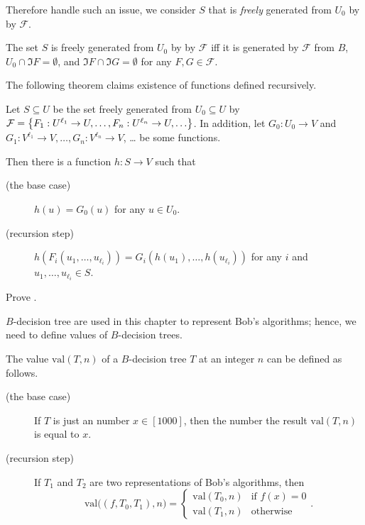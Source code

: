 Therefore handle such an issue, we consider $S$ that is \emph{freely} generated
from $U_0$ by by $\mathcal{F}$.
\begin{definition}
  The set $S$ is freely generated from $U_0$ by by $\mathcal{F}$ iff it is
  generated by $\mathcal{F}$ from $B$,
  $U_0 \cap \Im F = \emptyset$, and $\Im F \cap \Im G = \emptyset$ for any
  $F, G \in \mathcal{F}$.
\end{definition}

The following theorem claims existence of functions defined recursively.
\begin{theorem}
\label{theorem:recursion-principle}
    Let $S \subseteq U$ be the set freely generated from $U_0 \subseteq U$ by
    $\mathcal{F} =
      \set{F_1 : U^{\ell_1} \to U, \dots, F_n : U^{\ell_n} \to U, \dots}$.
    In addition, let $G_0 : U_0 \to V$ and
    $G_1 : V^{\ell_1} \to V, \dots, G_n : V^{\ell_n} \to V$, \dots
    be some functions.

    Then there is a function $h : S \to V$ such that
    \begin{description}
        \item [(the base case)] $h(u) = G_0(u)$ for any $u \in U_0$.
        \item[(recursion step)] $h(F_i(u_1, \dots, u_{\ell_i})) =
            G_i(h(u_1), \dots, h(u_{\ell_i}))$ for any $i$ and
            $u_1, \dots, u_{\ell_i} \in S$.
    \end{description}
\end{theorem}

\begin{exercise}
    Prove .
\end{exercise}

$B$-decision tree are used in this chapter to represent Bob's algorithms;
hence, we need to define values of $B$-decision trees.
\begin{definition}
  The value
  $\mathrm{val}(T, n)$ of a $B$-decision tree $T$ at an integer $n$ can
  be defined as follows.
  \begin{description}
      \item [(the base case)] If $T$ is just an number $x \in [1000]$,
        then the number the result $\mathrm{val}(T, n)$ is equal to $x$.
      \item[(recursion step)] If $T_1$ and $T_2$ are two representations of
        Bob's algorithms, then
        \[
          \mathrm{val}\big((f, T_0, T_1), n\big) =
          \begin{cases}
            \mathrm{val}(T_0, n) & \text{if } f(x) = 0 \\
            \mathrm{val}(T_1, n) & \text{otherwise}
          \end{cases}.
        \]
  \end{description}
\end{definition}

